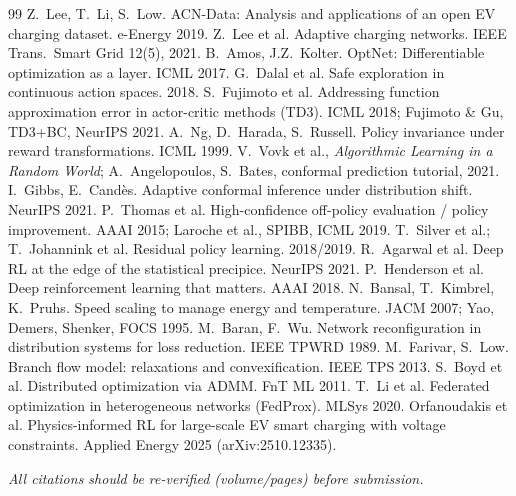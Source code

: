 \documentclass[10pt,a4paper]{article}
\begin{document}
\begin{thebibliography}{99}\small
{} Z.~Lee, T.~Li, S.~Low. ACN-Data: Analysis and applications of an open EV charging dataset. e-Energy 2019.
 Z.~Lee et al. Adaptive charging networks. IEEE Trans.\ Smart Grid 12(5), 2021.
 B.~Amos, J.Z.~Kolter. OptNet: Differentiable optimization as a layer. ICML 2017.
 G.~Dalal et al. Safe exploration in continuous action spaces. 2018.
 S.~Fujimoto et al. Addressing function approximation error in actor-critic methods (TD3). ICML 2018; Fujimoto \& Gu, TD3+BC, NeurIPS 2021.
 A.~Ng, D.~Harada, S.~Russell. Policy invariance under reward transformations. ICML 1999.
 V.~Vovk et al., \emph{Algorithmic Learning in a Random World}; A.~Angelopoulos, S.~Bates, conformal prediction tutorial, 2021.
 I.~Gibbs, E.~Cand\`es. Adaptive conformal inference under distribution shift. NeurIPS 2021.
 P.~Thomas et al. High-confidence off-policy evaluation / policy improvement. AAAI 2015; Laroche et al., SPIBB, ICML 2019.
 T.~Silver et al.; T.~Johannink et al. Residual policy learning. 2018/2019.
 R.~Agarwal et al. Deep RL at the edge of the statistical precipice. NeurIPS 2021.
 P.~Henderson et al. Deep reinforcement learning that matters. AAAI 2018.
 N.~Bansal, T.~Kimbrel, K.~Pruhs. Speed scaling to manage energy and temperature. JACM 2007; Yao, Demers, Shenker, FOCS 1995.
 M.~Baran, F.~Wu. Network reconfiguration in distribution systems for loss reduction. IEEE TPWRD 1989.
 M.~Farivar, S.~Low. Branch flow model: relaxations and convexification. IEEE TPS 2013.
 S.~Boyd et al. Distributed optimization via ADMM. FnT ML 2011.
 T.~Li et al. Federated optimization in heterogeneous networks (FedProx). MLSys 2020.
 Orfanoudakis et al. Physics-informed RL for large-scale EV smart charging with voltage constraints. Applied Energy 2025 (arXiv:2510.12335).
\end{thebibliography}
\noindent\footnotesize\emph{All citations should be re-verified (volume/pages) before submission.}
\end{document}
